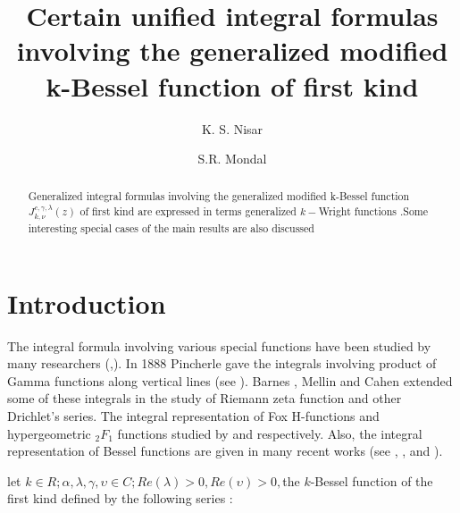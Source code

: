 \documentclass{amsart}
\theoremstyle{plain}
\numberwithin{equation}{section}
\begin{document}
\title[Some Unified integrals of generalized K-Bessel function]{Certain
unified integral formulas involving the generalized modified k-Bessel
function of first kind}
\author{K. S. Nisar}
\address{Department of Mathematics, College of Arts \& Science-Wadi Addwaser\\
Prince Sattam bin Abdulaziz University, Saudi Arabia}
\author{S.R. Mondal}
\address{Department of Mathematics, College of Science-Al Ahsa\\
King Faisal University, Saudi Arabia}

\begin{abstract}
Generalized integral formulas involving the generalized modified k-Bessel
function $J_{k,\nu }^{c,\gamma ,\lambda }\left( z\right) $ of first kind are
expressed in terms generalized $k-$Wright functions .Some interesting
special cases of the main results are also discussed
\end{abstract}

\maketitle

\section{\protect\bigskip Introduction}

The integral formula involving various special functions have been studied
by many researchers (\cite{Brychkov},\cite{Choi1}). In 1888 Pincherle gave
the integrals involving product of Gamma functions along vertical lines (see 
\cite{Pincherle,Pincherle1,Pincherle2}). Barnes \cite{Barnes} , Mellin \cite{Mellin} and Cahen \cite{Cahen} extended some of these integrals in the
study of Riemann zeta function and other Drichlet's series. The integral
representation of Fox H-functions and hypergeometric $_{2}F_{1}$ functions
studied by \cite{Garg} and \cite{Ali} respectively. Also, the integral
representation of Bessel functions are given in many recent works (see \cite{Choi2}, \cite{Choi-Mathur}, \cite{Brychkov} and \cite{Watson}).

let $k\in R;\alpha ,\lambda ,\gamma ,\upsilon \in C;Re\left( \lambda \right)
>0,Re\left( \upsilon \right) >0,$the $k$-Bessel function of the first kind
defined by the following series \cite{Romero-Cerutti} :
\end{document}
